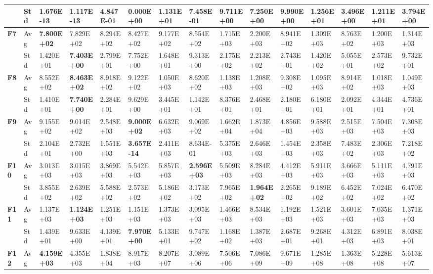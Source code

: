 \documentclass{article} %
\begin{document}
\begin{tabular}{|p{0.2in}|p{0.2in}|p{0.4in}|p{0.4in}|p{0.4in}|p{0.4in}|p{0.4in}|p{0.4in}|p{0.4in}|p{0.4in}|p{0.4in}|p{0.4in}|p{0.4in}|p{0.4in}|p{0.4in}|}
\textbf{} & Std & 1.676E-13 & 1.117E-13 & 4.847E-01 & \textbf{0.000E+00} & 1.131E+01 & 7.458E-01 & 9.711E+00 & 7.250E+00 & 9.990E+00 & 1.256E+01 & 3.496E+00 & 1.211E+01 & 3.794E+00 \\ \hline 
\textbf{F7} & Avg & \textbf{7.800E+02} & 7.829E+02 & 8.294E+02 & 8.427E+02 & 9.177E+02 & 8.554E+02 & 1.715E+03 & 2.200E+03 & 8.941E+02 & 1.309E+03 & 8.763E+02 & 1.200E+03 & 1.314E+03 \\ \hline 
\textbf{} & Std & 1.420E+01 & \textbf{7.403E+00} & 2.799E+01 & 7.752E+00 & 1.648E+01 & 9.313E+00 & 2.175E+02 & 2.213E+02 & 2.743E+01 & 1.420E+02 & 5.055E+01 & 2.573E+02 & 9.732E+01 \\ \hline 
\textbf{F8} & Avg & 8.552E+02 & \textbf{8.463E+02} & 8.918E+02 & 9.122E+02 & 1.050E+03 & 8.620E+02 & 1.138E+03 & 1.208E+03 & 9.308E+02 & 1.095E+03 & 8.914E+02 & 1.018E+03 & 1.049E+03 \\ \hline 
\textbf{} & Std & 1.410E+01 & \textbf{7.740E+00} & 2.284E+01 & 9.629E+00 & 3.445E+01 & 1.142E+01 & 8.376E+01 & 2.468E+01 & 2.180E+01 & 6.180E+01 & 2.092E+01 & 4.344E+01 & 4.736E+01 \\ \hline 
\textbf{F9} & Avg & 9.155E+02 & 9.014E+02 & 2.548E+03 & \textbf{9.000E+02} & 6.632E+03 & 9.069E+02 & 1.662E+04 & 1.873E+04 & 4.856E+03 & 9.588E+03 & 2.515E+03 & 7.504E+03 & 7.308E+03 \\ \hline 
\textbf{} & Std & 2.104E+01 & 2.732E+00 & 1.551E+03 & \textbf{3.657E-14} & 2.411E+03 & 8.634E-01 & 5.375E+03 & 2.646E+03 & 1.454E+03 & 2.358E+03 & 7.483E+02 & 2.306E+03 & 7.218E+02 \\ \hline 
\textbf{F10} & Avg & 3.013E+03 & 3.015E+03 & 3.869E+03 & 5.542E+03 & 5.857E+03 & \textbf{2.596E+03} & 5.509E+03 & 8.284E+03 & 4.412E+03 & 5.911E+03 & 3.666E+03 & 5.111E+03 & 4.791E+03 \\ \hline 
\textbf{} & Std & 3.855E+02 & 2.639E+02 & 5.588E+02 & 2.573E+02 & 5.186E+02 & 3.173E+02 & 7.965E+02 & \textbf{1.964E+02} & 2.265E+02 & 9.189E+02 & 6.452E+02 & 7.024E+02 & 6.470E+02 \\ \hline 
\textbf{F11} & Avg & 1.137E+03 & \textbf{1.124E+03} & 1.251E+03 & 1.151E+03 & 1.373E+03 & 3.095E+03 & 1.466E+03 & 8.534E+03 & 1.192E+03 & 1.521E+03 & 3.601E+03 & 7.035E+03 & 1.371E+03 \\ \hline 
\textbf{} & Std & 1.439E+01 & 9.633E+00 & 4.139E+01 & \textbf{7.970E+00} & 5.133E+01 & 9.747E+02 & 1.168E+02 & 1.387E+03 & 2.687E+01 & 9.268E+01 & 4.312E+03 & 6.891E+03 & 8.038E+01 \\ \hline 
\textbf{F12} & Avg & \textbf{4.159E+03} & 4.355E+03 & 1.838E+04 & 8.917E+03 & 8.207E+07 & 3.089E+06 & 7.506E+06 & 7.086E+09 & 9.671E+09 & 1.285E+08 & 1.363E+08 & 5.228E+08 & 5.613E+07 \\ \hline 

\end{tabular}
\end{document}
